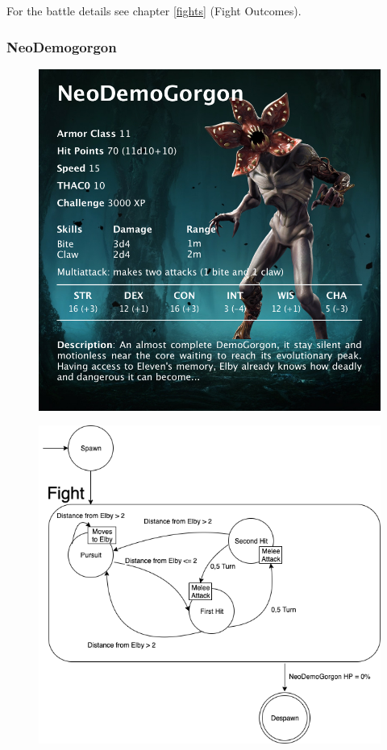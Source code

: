 For the battle details see chapter \ref{fights} (Fight Outcomes).
\newpage



\subsubsection{NeoDemogorgon}
\vspace*{0.3cm}
\begin{figure}[H]
	\centering
	\includegraphics[width=0.9\linewidth]{images/visual_stats/neodemogorgon.png}
\end{figure}
\newpage
\begin{figure}[H]
	\centering
	\includegraphics[width=0.8\linewidth]{images/graphs/fsa/fsa_neodemogorgon.png}
\end{figure}


